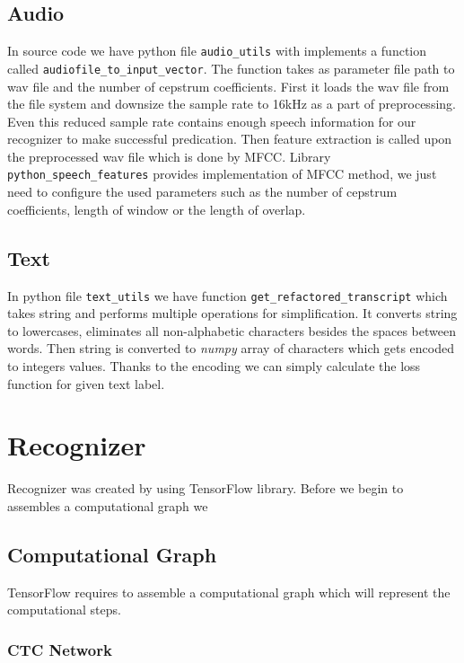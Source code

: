 \subsection{Audio}

In source code we have python file \texttt{audio\_utils} with implements a function called \texttt{audiofile\_to\_input\_vector}.
The function takes as parameter file path to wav file and the number of cepstrum coefficients.
First it loads the wav file from the file system and downsize the sample rate to 16kHz as a part of preprocessing.
Even this reduced sample rate contains enough speech information for our recognizer to make successful predication.
Then feature extraction is called upon the preprocessed wav file which is done by MFCC.
Library \texttt{python\_speech\_features} provides implementation of MFCC method, we just need to configure the used parameters such as the number of cepstrum coefficients, length of window or the length of overlap.

\subsection{Text}

In python file \texttt{text\_utils} we have function \texttt{get\_refactored\_transcript} which takes string and performs multiple operations for simplification.
It converts string to lowercases, eliminates all non-alphabetic characters besides the spaces between words.
Then string is converted to \textit{numpy} array of characters which gets encoded to integers values.
Thanks to the encoding we can simply calculate the loss function for given text label.


\section{Recognizer}

Recognizer was created by using TensorFlow library. Before we begin to assembles a computational graph we

\subsection{Computational Graph}

TensorFlow requires to assemble a computational graph which will represent the computational steps.

\subsubsection{CTC Network}


